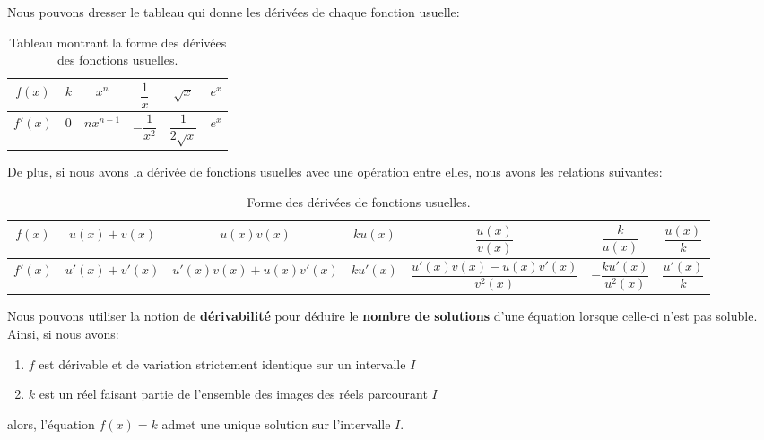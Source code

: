 \documentclass[12pt,a4paper,openany]{book}
\begin{document}
Nous pouvons dresser le tableau qui donne les dérivées de chaque fonction usuelle:
\begin{table}[!h]
\begin{center}
\begin{tabular}{|c|c|c|c|c|c|} %
\hline $ f(x) $ & $ k $ & $ x^{n} $ & $ \dfrac{1}{x} $ & $ \sqrt{x} $ & $ e^{x} $\\
\hline $ f'(x) $ & $ 0 $ & $ nx^{n-1} $ & $ -\dfrac{1}{x^{2}} $ & $ \dfrac{1}{2\sqrt{x}} $ & $ e^{x} $\\
\hline
\end{tabular}
\caption{Tableau montrant la forme des dérivées des fonctions usuelles.}
\label{tableauDeriveesUsuelles}
\end{center}
\end{table}

De plus, si nous avons la dérivée de fonctions usuelles avec une opération entre elles, nous avons les relations suivantes:
\begin{table}[!h]
\begin{center}
\begin{tabular}{|c|c|c|c|c|c|c|} %
\hline $ f(x) $ & $ u(x) + v(x) $ & $ u(x)v(x) $ & $ ku(x) $ & $ \dfrac{u(x)}{v(x)} $ & $ \dfrac{k}{u(x)} $ & $ \dfrac{u(x)}{k} $\\
\hline $ f'(x) $ & $ u'(x) + v'(x) $ & $ u'(x)v(x) + u(x)v'(x) $ & $ ku'(x) $ & $ \dfrac{u'(x)v(x) - u(x)v'(x)}{v^{2}(x)} $ & $ -\dfrac{ku'(x)}{u^{2}(x)} $ & $ \dfrac{u'(x)}{k} $\\
\hline
\end{tabular}
\caption{Forme des dérivées de fonctions usuelles.}
\label{tableauDeriveesFonctionsUsuelles}
\end{center}
\end{table}

Nous pouvons utiliser la notion de \textbf{dérivabilité} pour déduire le \textbf{nombre de solutions} d'une équation lorsque celle-ci n'est pas soluble. Ainsi, si nous avons:
\begin{enumerate}
\item $ f $ est dérivable et de variation strictement identique sur un intervalle $ I $
\item $ k $ est un réel faisant partie de l'ensemble des images des réels parcourant $ I $
\end{enumerate}

alors, l'équation $ f(x) = k $ admet une unique solution sur l'intervalle $ I $.
\end{document}

